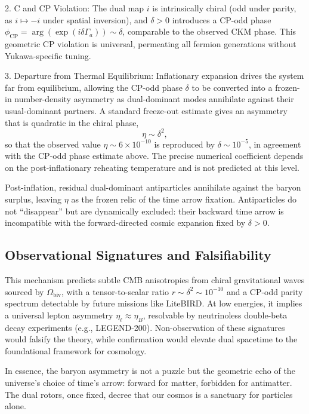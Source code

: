 \documentclass[dvipdfmx,a4paper]{article}
\begin{document}
2. C and CP Violation: The dual map $i$ is intrinsically chiral (odd under parity, as $i \mapsto -i$ under spatial inversion), and $\delta > 0$ introduces a CP-odd phase $\phi_\text{CP} = \arg(\exp(i \delta \Gamma_a)) \sim \delta$, comparable to the observed CKM phase. This geometric CP violation is universal, permeating all fermion generations without Yukawa-specific tuning.

3. Departure from Thermal Equilibrium: Inflationary expansion drives the system far from equilibrium, allowing the CP-odd phase $\delta$ to be converted into a frozen-in number-density asymmetry as dual-dominant modes annihilate against their usual-dominant partners. A standard freeze-out estimate gives an asymmetry that is quadratic in the chiral phase,
\[
\eta \sim \delta^2,
\]
so that the observed value $\eta \sim 6 \times 10^{-10}$ is reproduced by $\delta \sim 10^{-5}$, in agreement with the CP-odd phase estimate above. The precise numerical coefficient depends on the post-inflationary reheating temperature and is not predicted at this level.

Post-inflation, residual dual-dominant antiparticles annihilate against the baryon surplus, leaving $\eta$ as the frozen relic of the time arrow fixation. Antiparticles do not ``disappear'' but are dynamically excluded: their backward time arrow is incompatible with the forward-directed cosmic expansion fixed by $\delta > 0$.

\subsection{Observational Signatures and Falsifiability}

This mechanism predicts subtle CMB anisotropies from chiral gravitational waves sourced by $\Omega_\text{biv}$, with a tensor-to-scalar ratio $r \sim \delta^2 \sim 10^{-10}$ and a CP-odd parity spectrum detectable by future missions like LiteBIRD. At low energies, it implies a universal lepton asymmetry $\eta_\ell \approx \eta_B$, resolvable by neutrinoless double-beta decay experiments (e.g., LEGEND-200). Non-observation of these signatures would falsify the theory, while confirmation would elevate dual spacetime to the foundational framework for cosmology.

In essence, the baryon asymmetry is not a puzzle but the geometric echo of the universe's choice of time's arrow: forward for matter, forbidden for antimatter. The dual rotors, once fixed, decree that our cosmos is a sanctuary for particles alone.
\end{document}
